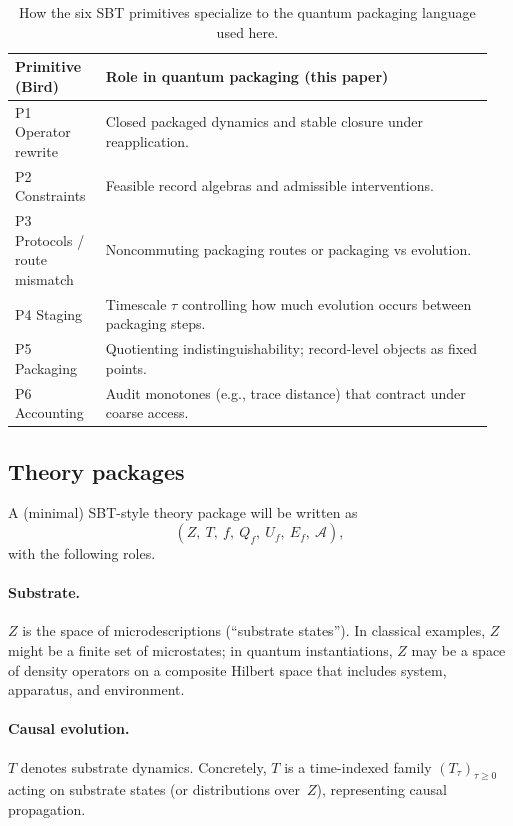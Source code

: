 \documentclass[11pt]{article}
\begin{document}
\begin{table}[t]
\centering
\small
\begin{tabular}{@{}>{\raggedright\arraybackslash}p{0.18\linewidth}p{0.77\linewidth}@{}}
\toprule
\textbf{Primitive (Bird)} & \textbf{Role in quantum packaging (this paper)} \\
\midrule
P1 Operator rewrite & Closed packaged dynamics and stable closure under reapplication. \\
P2 Constraints & Feasible record algebras and admissible interventions. \\
P3 Protocols / route mismatch & Noncommuting packaging routes or packaging vs evolution. \\
P4 Staging & Timescale $\tau$ controlling how much evolution occurs between packaging steps. \\
P5 Packaging & Quotienting indistinguishability; record-level objects as fixed points. \\
P6 Accounting & Audit monotones (e.g., trace distance) that contract under coarse access. \\
\bottomrule
\end{tabular}
\caption{How the six SBT primitives specialize to the quantum packaging language used here.}
\label{tab:six-birds-quantum}
\end{table}

\subsection{Theory packages}

A (minimal) SBT-style theory package will be written as
\[
(Z,\ T,\ f,\ Q_f,\ U_f,\ E_f,\ \mathcal{A}),
\]
with the following roles.

\paragraph{Substrate.}
$Z$ is the space of microdescriptions (``substrate states''). In classical examples, $Z$ might be a finite set of microstates; in quantum instantiations, $Z$ may be a space of density operators on a composite Hilbert space that includes system, apparatus, and environment.

\paragraph{Causal evolution.}
$T$ denotes substrate dynamics. Concretely, $T$ is a time-indexed family $(T_\tau)_{\tau\ge 0}$ acting on substrate states (or distributions over~$Z$), representing causal propagation.
\end{document}
